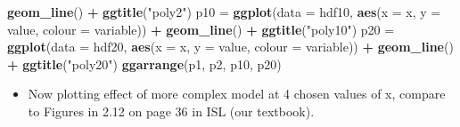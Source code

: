 \documentclass[]{article}
\newenvironment{Shaded}{\begin{snugshade}}{\end{snugshade}}
\newcommand{\KeywordTok}[1]{\textcolor[rgb]{0.13,0.29,0.53}{\textbf{#1}}}
\newcommand{\DataTypeTok}[1]{\textcolor[rgb]{0.13,0.29,0.53}{#1}}
\newcommand{\StringTok}[1]{\textcolor[rgb]{0.31,0.60,0.02}{#1}}
\newcommand{\OperatorTok}[1]{\textcolor[rgb]{0.81,0.36,0.00}{\textbf{#1}}}
\newcommand{\NormalTok}[1]{#1}
\providecommand{\tightlist}{%
  \setlength{\itemsep}{0pt}\setlength{\parskip}{0pt}}
\begin{document}
\begin{Shaded}
\begin{Highlighting}[]
\StringTok{    }\KeywordTok{geom_line}\NormalTok{() }\OperatorTok{+}\StringTok{ }\KeywordTok{ggtitle}\NormalTok{(}\StringTok{"poly2"}\NormalTok{)}
\NormalTok{p10 =}\StringTok{ }\KeywordTok{ggplot}\NormalTok{(}\DataTypeTok{data =}\NormalTok{ hdf10, }\KeywordTok{aes}\NormalTok{(}\DataTypeTok{x =}\NormalTok{ x, }\DataTypeTok{y =}\NormalTok{ value, }\DataTypeTok{colour =}\NormalTok{ variable)) }\OperatorTok{+}\StringTok{ }
\StringTok{    }\KeywordTok{geom_line}\NormalTok{() }\OperatorTok{+}\StringTok{ }\KeywordTok{ggtitle}\NormalTok{(}\StringTok{"poly10"}\NormalTok{)}
\NormalTok{p20 =}\StringTok{ }\KeywordTok{ggplot}\NormalTok{(}\DataTypeTok{data =}\NormalTok{ hdf20, }\KeywordTok{aes}\NormalTok{(}\DataTypeTok{x =}\NormalTok{ x, }\DataTypeTok{y =}\NormalTok{ value, }\DataTypeTok{colour =}\NormalTok{ variable)) }\OperatorTok{+}\StringTok{ }
\StringTok{    }\KeywordTok{geom_line}\NormalTok{() }\OperatorTok{+}\StringTok{ }\KeywordTok{ggtitle}\NormalTok{(}\StringTok{"poly20"}\NormalTok{)}
\KeywordTok{ggarrange}\NormalTok{(p1, p2, p10, p20)}
\end{Highlighting}
\end{Shaded}

\begin{itemize}
\tightlist
\item
  Now plotting effect of more complex model at 4 chosen values of x,
  compare to Figures in 2.12 on page 36 in ISL (our textbook).
\end{itemize}
\end{document}
